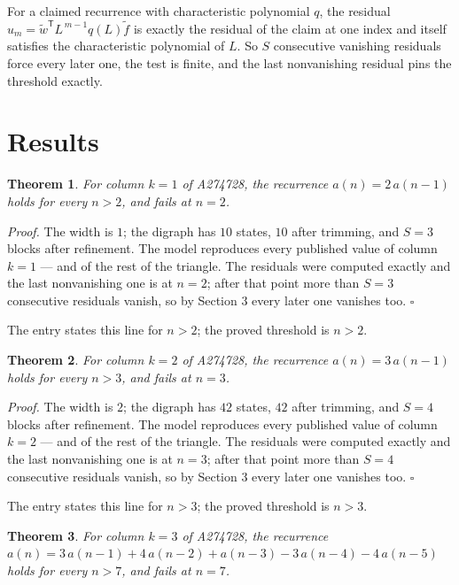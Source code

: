 \documentclass[11pt]{article}
\newtheorem{theorem}{Theorem}
\theoremstyle{definition}
\begin{document}
For a claimed recurrence with characteristic polynomial $q$, the residual $u_m = \tilde w^{\mathsf T}L^{\,m-1}q(L)\tilde f$ is exactly the residual of the claim at one index and itself satisfies the characteristic polynomial of $L$. So $S$ consecutive vanishing residuals force every later one, the test is finite, and the last nonvanishing residual pins the threshold exactly.

\section{Results}

\begin{theorem} For column $k = 1$ of A274728, the recurrence $a(n) = 2\,a(n-1)$ holds for every $n > 2$, and fails at $n = 2$.\end{theorem}

{\itshape Proof.} The width is $1$; the digraph has $10$ states, $10$ after trimming, and $S = 3$ blocks after refinement. The model reproduces every published value of column $k = 1$ --- and of the rest of the triangle. The residuals were computed exactly and the last nonvanishing one is at $n = 2$; after that point more than $S = 3$ consecutive residuals vanish, so by Section 3 every later one vanishes too. $\square$

The entry states this line for $n > 2$; the proved threshold is $n > 2$.

\begin{theorem} For column $k = 2$ of A274728, the recurrence $a(n) = 3\,a(n-1)$ holds for every $n > 3$, and fails at $n = 3$.\end{theorem}

{\itshape Proof.} The width is $2$; the digraph has $42$ states, $42$ after trimming, and $S = 4$ blocks after refinement. The model reproduces every published value of column $k = 2$ --- and of the rest of the triangle. The residuals were computed exactly and the last nonvanishing one is at $n = 3$; after that point more than $S = 4$ consecutive residuals vanish, so by Section 3 every later one vanishes too. $\square$

The entry states this line for $n > 3$; the proved threshold is $n > 3$.

\begin{theorem} For column $k = 3$ of A274728, the recurrence $a(n) = 3\,a(n-1) + 4\,a(n-2) + a(n-3) - 3\,a(n-4) - 4\,a(n-5)$ holds for every $n > 7$, and fails at $n = 7$.\end{theorem}
\end{document}
